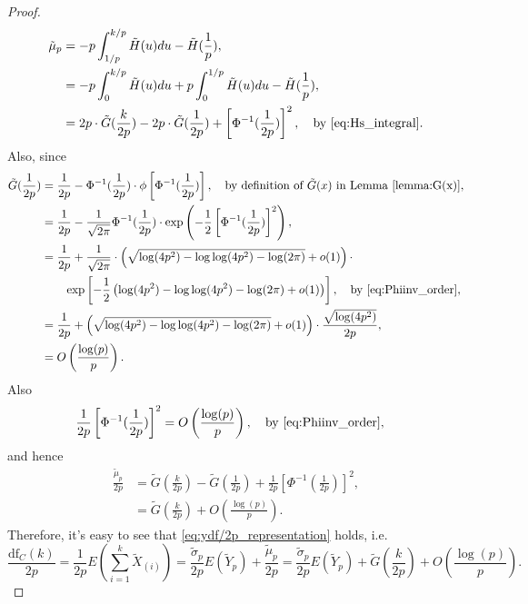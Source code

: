 \begin{proof}
	\begin{equation*}
	\begin{aligned}
	\tilde{\mu}_p &= -p \int_{1/p}^{k/p} \tilde{H}(u) du - \tilde{H}(\frac{1}{p}),\\
	&= -p \int_{0}^{k/p} \tilde{H}(u) du + p \int_{0}^{1/p} \tilde{H}(u) du - \tilde{H}(\frac{1}{p}),\\
	&= 2p\cdot \tilde{G}(\frac{k}{2p}) - 2p \cdot \tilde{G}(\frac{1}{2p}) + \left[\Phi^{-1}(\frac{1}{2p})\right]^2, \quad \text{by \eqref{eq:Hs_integral}}.
	\end{aligned}		
	\end{equation*}
	Also, since
	\begin{equation*}
	\begin{aligned}
	\tilde{G}(\frac{1}{2p}) &= \frac{1}{2p} - \Phi^{-1}(\frac{1}{2p}) \cdot \phi\left[\Phi^{-1}(\frac{1}{2p}) \right],\quad \text{by definition of $\tilde{G}(x)$ in Lemma \ref{lemma:G(x)}},\\
	&= \frac{1}{2p} - \frac{1}{\sqrt{2\pi}}\Phi^{-1}(\frac{1}{2p}) \cdot \exp\left(-\frac{1}{2}\left[\Phi^{-1}(\frac{1}{2p}) \right]^2\right),\\
	&= \frac{1}{2p} + \frac{1}{\sqrt{2\pi}} \cdot \left(\sqrt{\log(4p^2)-\log\log(4p^2)-\log(2\pi)}+o(1)\right)\cdot \\
	& \qquad \exp\left[-\frac{1}{2} \left(\log(4p^2)-\log\log(4p^2)-\log(2\pi) +o(1)\right)\right], \quad \text{by \eqref{eq:Phiinv_order}},\\
	&= \frac{1}{2p} + \left(\sqrt{\log(4p^2)-\log\log(4p^2)-\log(2\pi)}+o(1)\right)\cdot \frac{\sqrt{\log(4p^2)}}{2p},\\
	&= O\left(\frac{\log(p)}{p}\right).
	\end{aligned}
	\end{equation*}
	Also
	\begin{equation*}
	\begin{aligned}
	\frac{1}{2p}\left[\Phi^{-1}(\frac{1}{2p})\right]^2 &= O\left( \frac{\log(p)}{p}\right), \quad \text{by \eqref{eq:Phiinv_order}},
	\end{aligned}
	\end{equation*}
	and hence
	\begin{equation*}
	\begin{aligned}
	\frac{\tilde{\mu}_p}{2p} &= \tilde{G}(\frac{k}{2p}) - \tilde{G}(\frac{1}{2p}) + \frac{1}{2p}\left[\Phi^{-1}(\frac{1}{2p})\right]^2,\\
	&= \tilde{G}(\frac{k}{2p}) + O\left( \frac{\log(p)}{p}\right).
	\end{aligned}
	\end{equation*}
	Therefore, it's easy to see that \eqref{eq:ydf/2p_representation} holds, i.e.
	\begin{equation*}
	\frac{\text{df}_C(k)}{2p}=\frac{1}{2p} E(\sum_{i=1}^{k} \tilde{X}_{(i)}) = \frac{\tilde{\sigma}_p}{2p} E(\tilde{Y}_p) + \frac{\tilde{\mu}_p}{2p}=\frac{\tilde{\sigma}_p}{2p} E(\tilde{Y}_p) + \tilde{G}(\frac{k}{2p}) + O\left( \frac{\log(p)}{p}\right).
	\end{equation*}
\end{proof}

